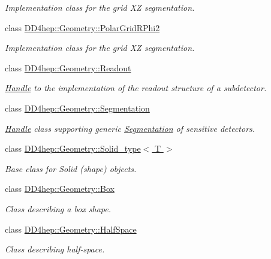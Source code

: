 \begin{DoxyCompactItemize}
\begin{DoxyCompactList}\small\item\em Implementation class for the grid XZ segmentation. \end{DoxyCompactList}\item 
class \hyperlink{class_d_d4hep_1_1_geometry_1_1_polar_grid_r_phi2}{D\+D4hep\+::\+Geometry\+::\+Polar\+Grid\+R\+Phi2}
\begin{DoxyCompactList}\small\item\em Implementation class for the grid XZ segmentation. \end{DoxyCompactList}\item 
class \hyperlink{class_d_d4hep_1_1_geometry_1_1_readout}{D\+D4hep\+::\+Geometry\+::\+Readout}
\begin{DoxyCompactList}\small\item\em \hyperlink{class_d_d4hep_1_1_handle}{Handle} to the implementation of the readout structure of a subdetector. \end{DoxyCompactList}\item 
class \hyperlink{class_d_d4hep_1_1_geometry_1_1_segmentation}{D\+D4hep\+::\+Geometry\+::\+Segmentation}
\begin{DoxyCompactList}\small\item\em \hyperlink{class_d_d4hep_1_1_handle}{Handle} class supporting generic \hyperlink{class_d_d4hep_1_1_geometry_1_1_segmentation}{Segmentation} of sensitive detectors. \end{DoxyCompactList}\item 
class \hyperlink{class_d_d4hep_1_1_geometry_1_1_solid__type}{D\+D4hep\+::\+Geometry\+::\+Solid\+\_\+type$<$ T $>$}
\begin{DoxyCompactList}\small\item\em Base class for Solid (shape) objects. \end{DoxyCompactList}\item 
class \hyperlink{class_d_d4hep_1_1_geometry_1_1_box}{D\+D4hep\+::\+Geometry\+::\+Box}
\begin{DoxyCompactList}\small\item\em Class describing a box shape. \end{DoxyCompactList}\item 
class \hyperlink{class_d_d4hep_1_1_geometry_1_1_half_space}{D\+D4hep\+::\+Geometry\+::\+Half\+Space}
\begin{DoxyCompactList}\small\item\em Class describing half-\/space. \end{DoxyCompactList}\item 

\end{DoxyCompactItemize}
